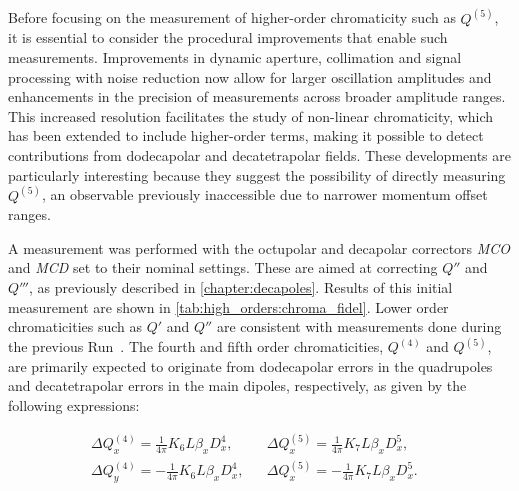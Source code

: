 \FloatBarrier
\subsection{}

Before focusing on the measurement of higher-order chromaticity such as $Q^{(5)}$, it is essential
to consider the procedural improvements that enable such measurements. Improvements in dynamic
aperture, collimation and signal processing with noise reduction now allow for larger oscillation
amplitudes and enhancements in the precision of measurements across broader amplitude ranges. This
increased resolution facilitates the study of non-linear chromaticity, which has been extended to
include higher-order terms, making it possible to detect contributions from dodecapolar and
decatetrapolar fields.
These developments are particularly interesting because they suggest the possibility of directly
measuring $Q^{(5)}$, an observable previously inaccessible due to narrower momentum offset ranges.


A measurement was performed with the octupolar and decapolar correctors \textit{MCO} and
\textit{MCD} set to their nominal settings. These are aimed at correcting $Q''$ and $Q'''$, as
previously described in \cref{chapter:decapoles}. Results of this initial measurement are shown in
\cref{tab:high_orders:chroma_fidel}. Lower order chromaticities such as $Q'$ and $Q''$ are
consistent with measurements done during the previous Run~\cite{maclean_commissioning_2016}.
The fourth and fifth order chromaticities, $Q^{(4)}$ and $Q^{(5)}$, are primarily expected
to originate from dodecapolar errors in the quadrupoles and decatetrapolar errors in the main
dipoles, respectively, as given by the following expressions:

\begin{equation}
    \begin{aligned}
        &\Delta Q_x^{(4)} =  \frac{1}{4\pi} K_{6} L \beta_x D_x^{4}, 
        &&\Delta Q_x^{(5)} =  \frac{1}{4\pi} K_{7} L \beta_x D_x^{5},&&\\
        &\Delta Q_y^{(4)} = -\frac{1}{4\pi} K_{6} L \beta_x D_x^{4},
        &&\Delta Q_x^{(5)} = -\frac{1}{4\pi} K_{7} L \beta_x D_x^{5}.
    \end{aligned}
\end{equation}


